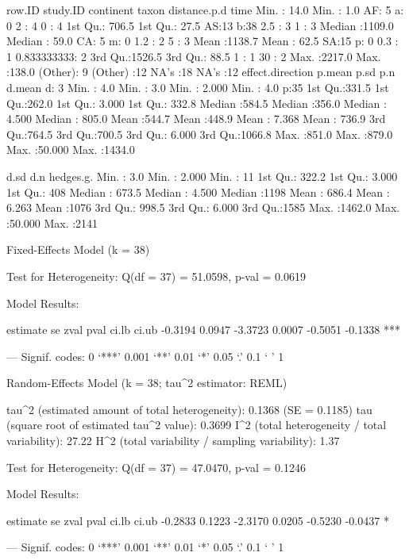 \documentclass[11pt, a4paper]{article}
\begin{document}
\begin{Schunk}
\begin{Soutput}
     row.ID          study.ID     continent taxon   distance.p.d          time   
 Min.   :  14.0   Min.   :  1.0   AF: 5     a: 0   2      : 4    0          : 4  
 1st Qu.: 706.5   1st Qu.: 27.5   AS:13     b:38   2.5    : 3    1          : 3  
 Median :1109.0   Median : 59.0   CA: 5     m: 0   1.2    : 2    5          : 3  
 Mean   :1138.7   Mean   : 62.5   SA:15     p: 0   0.3    : 1    0.833333333: 2  
 3rd Qu.:1526.5   3rd Qu.: 88.5                    1      : 1    30         : 2  
 Max.   :2217.0   Max.   :138.0                    (Other): 9    (Other)    :12  
                                                   NA's   :18    NA's       :12  
 effect.direction     p.mean           p.sd            p.n             d.mean      
 d: 3             Min.   :  4.0   Min.   :  3.0   Min.   : 2.000   Min.   :   4.0  
 p:35             1st Qu.:331.5   1st Qu.:262.0   1st Qu.: 3.000   1st Qu.: 332.8  
                  Median :584.5   Median :356.0   Median : 4.500   Median : 805.0  
                  Mean   :544.7   Mean   :448.9   Mean   : 7.368   Mean   : 736.9  
                  3rd Qu.:764.5   3rd Qu.:700.5   3rd Qu.: 6.000   3rd Qu.:1066.8  
                  Max.   :851.0   Max.   :879.0   Max.   :50.000   Max.   :1434.0  
                                                                                   
      d.sd             d.n           hedges.g.   
 Min.   :   3.0   Min.   : 2.000   Min.   :  11  
 1st Qu.: 322.2   1st Qu.: 3.000   1st Qu.: 408  
 Median : 673.5   Median : 4.500   Median :1198  
 Mean   : 686.4   Mean   : 6.263   Mean   :1076  
 3rd Qu.: 998.5   3rd Qu.: 6.000   3rd Qu.:1585  
 Max.   :1462.0   Max.   :50.000   Max.   :2141  
\end{Soutput}
\begin{Soutput}
Fixed-Effects Model (k = 38)

Test for Heterogeneity: 
Q(df = 37) = 51.0598, p-val = 0.0619

Model Results:

estimate       se     zval     pval    ci.lb    ci.ub          
 -0.3194   0.0947  -3.3723   0.0007  -0.5051  -0.1338      *** 

---
Signif. codes:  0 ‘***’ 0.001 ‘**’ 0.01 ‘*’ 0.05 ‘.’ 0.1 ‘ ’ 1 
\end{Soutput}
\begin{Soutput}
Random-Effects Model (k = 38; tau^2 estimator: REML)

tau^2 (estimated amount of total heterogeneity): 0.1368 (SE = 0.1185)
tau (square root of estimated tau^2 value):      0.3699
I^2 (total heterogeneity / total variability):   27.22%
H^2 (total variability / sampling variability):  1.37

Test for Heterogeneity: 
Q(df = 37) = 47.0470, p-val = 0.1246

Model Results:

estimate       se     zval     pval    ci.lb    ci.ub          
 -0.2833   0.1223  -2.3170   0.0205  -0.5230  -0.0437        * 

---
Signif. codes:  0 ‘***’ 0.001 ‘**’ 0.01 ‘*’ 0.05 ‘.’ 0.1 ‘ ’ 1 
\end{Soutput}
\end{Schunk}
\end{document}
